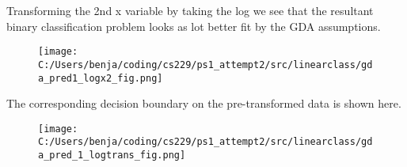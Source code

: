 %
%
\begin{answer}
	Transforming the 2nd x variable by taking the log we see that the resultant binary classification problem looks as lot better fit by the GDA assumptions.
	\begin{figure}[H]
	\texttt{[image: C:/Users/benja/coding/cs229/ps1\_attempt2/src/linearclass/gda\_pred1\_logx2\_fig.png]}
	\end{figure}

The corresponding decision boundary on the pre-transformed data is shown here.

	\begin{figure}[H]
	\texttt{[image: C:/Users/benja/coding/cs229/ps1\_attempt2/src/linearclass/gda\_pred\_1\_logtrans\_fig.png]}
\end{figure}
\end{answer}
%